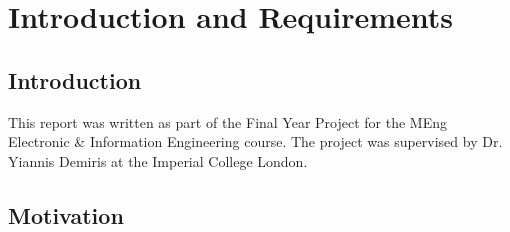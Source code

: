 \chapter{Introduction and Requirements}

\section{Introduction}
This report was written as part of the Final Year Project for the MEng Electronic \& Information Engineering course. The project was supervised by Dr. Yiannis Demiris at the Imperial College London.

\section{Motivation}
